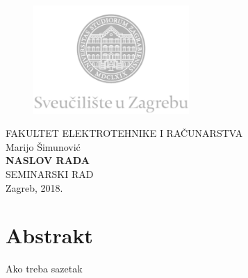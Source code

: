 \documentclass[12pt,oneside, a4paper]{article}
\begin{document}
\begin{titlepage}
  \fontsize{16pt}{20pt}\selectfont
  \selectfont
  \setlength{\intextsep}{0pt plus 0pt minus 0pt}

  \begin{center}
    \begin{figure}[ht!]
      \begin{center}
        \includegraphics[height=4.1184cm, width=5.94cm]{logo_unizg2}
      \end{center}
    \end{figure}		
    \vspace{0cm}
    {FAKULTET ELEKTROTEHNIKE I RAČUNARSTVA} \\
    \vspace{3cm}
    Marijo Šimunović \\
    \vspace{2cm}
    {\fontsize{22pt}{22pt}\selectfont\textbf{NASLOV RADA}} \\
    \vspace{2cm}    
    SEMINARSKI RAD \\
    \vspace{5cm}    %
    \vfill{Zagreb, 2018.}
  \end{center}
  \restoregeometry
\end{titlepage}

\tableofcontents
\clearpage
\listoffigures
\clearpage
\listoftables
\clearpage

\section{Abstrakt}

Ako treba sazetak

\clearpage


\clearpage


\clearpage


\clearpage

\end{document}
